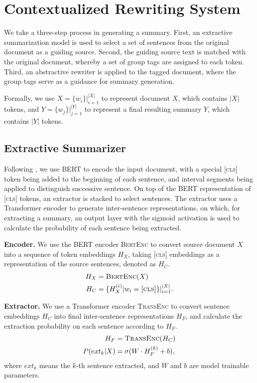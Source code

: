 \documentclass[letterpaper]{article} %
\begin{document}
\section{Contextualized Rewriting System}
\label{method}
We take a three-step process in generating a summary. First, an extractive summarization model is used to select a set of sentences from the original document as a guiding source. Second, the guiding source text is matched with the original document, whereby a set of group tags are assigned to each token. Third, an abstractive rewriter is applied to the tagged document, where the group tags serve as a guidance for summary generation.

Formally, we use $X=\{w_i\}|^{|X|}_{i=1}$ to represent document $X$, which contains $|X|$ tokens, and $Y=\{w_j\}|^{|Y|}_{j=1}$ to represent a final resulting summary $Y$, which contains $|Y|$ tokens.


\subsection{Extractive Summarizer}
\label{method:select}
Following \citet{Liu2019}, we use BERT to encode the input document, with a special \textsc{[cls]} token being added to the beginning of each sentence, and interval segments being applied to distinguish successive sentence. On top of the BERT representation of \textsc{[cls]} tokens, an extractor is stacked to select sentences. The extractor uses a Transformer \cite{Vaswani2017} encoder to generate inter-sentence representations, on which, for extracting a summary, an output layer with the sigmoid activation is used to calculate the probability of each sentence being extracted. 

\textbf{Encoder.} 
We use the BERT encoder \textsc{BertEnc} to convert source document $X$ into a sequence of token embeddings $H_X$, taking \textsc{[cls]} embeddings as a representation of the source sentences, denoted as $H_C$.
\begin{equation}
\begin{split}
  H_X &= \textsc{BertEnc}(X) \\
  H_C &= \{H_X^{(i)}|w_i=\textsc{[cls]}\}|^{|X|}_{i=1}.
\end{split}
\end{equation}

\textbf{Extractor.}
We use a Transformer encoder \textsc{TransEnc} to convert sentence embeddings $H_C$ into final inter-sentence representations $H_F$, and calculate the extraction probability on each sentence according to $H_F$.
\begin{equation}
\begin{split}
  H_F &= \textsc{TransEnc}(H_C)  \\
  P(ext_k|X) &= \sigma(W \cdot H_F^{(k)} + b),  \\
\end{split}
\end{equation}
where $ext_k$ means the $k$-th sentence extracted, and $W$ and $b$ are model trainable parameters. 
\end{document}
